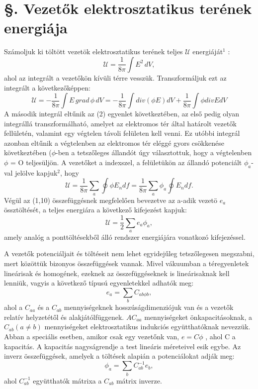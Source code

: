 \documentclass{article}
\begin{document}
\section{§. Vezetők elektrosztatikus terének energiája}
Számoljuk ki töltött vezetök elektrosztatikus terének teljes $\mathcal{U}$ energiáját$^1$ :
\begin{equation}
\mathcal{U} = \frac{1}{8\pi} \int E^2 \, dV,
\end{equation}
ahol az integrált a vezetőkön kívüli térre vesszük. Transzformáljuk ezt az integrált a következőképpen:
\begin{equation}
\mathcal{U} = -\frac{1}{8\pi} \int E \, grad \, \phi \, dV = -\frac{1}{8\pi} \int div (\phi E) dV + \frac{1}{8\pi} \int \phi div E dV
\end{equation}
A második integrál eltűnik az (2) egyenlet következtében, az első pedig olyan integrállá transzformálható, amelyet az elektromos tér által határolt vezetők fellületén, valamint egy végtelen távoli felületen kell venni. Ez utóbbi integrál azonban eltűnik a végtelenben az elektromos tér eléggé gyors csökkenése következtében ($\phi$-ben a tetszőleges állandót úgy választottuk, hogy a végtelenben $\phi$ = O teljesüljön. A vezetőket a indexszel, a felületükön az állandó potenciált $\phi_a$-val jelölve kapjuk$^2$, hogy
\begin{equation}
\mathcal{U} = \frac{1}{8\pi} \sum\limits_{a} \oint \phi E_n df = \frac{1}{8\pi} \sum\limits_{a} \phi_a \oint E_n df.
\end{equation}
Végül az (1,10) összefüggésnek megfelelően bevezetve az a-adik vezetö $e_a$ össztöltését, a teljes energiára a következő kifejezést kapjuk:
\begin{equation}
\mathcal{U} = \frac{1}{2} \sum\limits_{a} e_a \phi_a ,
\end{equation}
amely analóg a ponttöltésekből álló rendszer energiájára vonatkozó kifejezéssel.

A vezetők potenciáljait és töltéseit nem lehet egyidejűleg tetszőlegesen megszabni, mert közöttük bizonyos összefüggések vannak. Mivel vákuumban a téregyenletek lineárisak és homogének, ezeknek az összefüggéseknek is lineárisaknak kell lenniük, vagyis a következő típusú egyenletekkel adhatók meg:
\begin{equation}
e_a = \sum\limits_{b} C_{ab\phi b} ,
\end{equation}
ahol a $C_{aa}$ és a $C_{ab}$ mennyiségeknek hosszúságdimenziójuk van és a vezetők relatív helyzetétől és alakjátólfüggenek. $AC_{aa}$ mennyiségeket önkapacitásoknak, a $C_{ab}(a \neq b)$ mennyiségeket elektrosztatikus indukciós együtthatóknak nevezzük. Abban a
speciális esetben, amikor csak egy vezetőnk van, $e = C\phi$ , ahol C a kapacitás. A kapacitás nagyságrendje a test lineáris méreteivel esik egybe. Az inverz összefüggések, amelyek a töltések alapián a potenciálokat adják meg:
\begin{equation}
\phi_a = \sum\limits_{b} C_{ab}^{-1} e_b ,
\end{equation}
ahol $C_{ab}^{-1}$ együtthatók mátrixa a $C_{ab}$ mátrix inverze.
\end{document}
